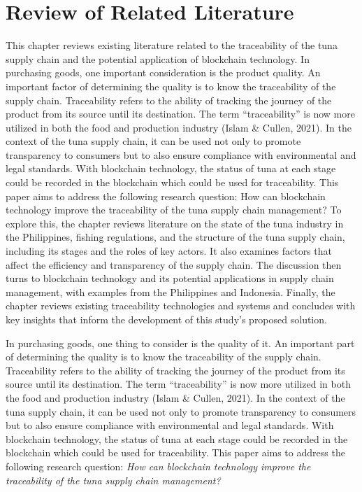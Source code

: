 \chapter{Review of Related Literature}
\label{sec:relatedlit}

This chapter reviews existing literature related to the traceability of the tuna supply chain and the potential application of blockchain technology. In purchasing goods, one important consideration is the product quality. An important factor of determining the quality is to know the traceability of the supply chain. Traceability refers to the ability of tracking the journey of the product from its source until its destination. The term “traceability” is now more utilized in both the food and production industry (Islam \& Cullen, 2021). In the context of the tuna supply chain, it can be used not only to promote transparency to consumers but to also ensure compliance with environmental and legal standards. With blockchain
technology, the status of tuna at each stage could be recorded in the blockchain which could be used for traceability. This paper aims to address the following research question: How can blockchain technology improve the traceability of the tuna supply chain management? To explore this, the chapter reviews literature on the state of the tuna industry in the Philippines, fishing regulations, and the structure of the tuna supply chain, including its stages and the roles of key actors. It also examines factors that affect the efficiency and transparency of the supply chain. The discussion then turns to blockchain technology and its potential applications in supply chain management, with examples from the Philippines and Indonesia. Finally, the chapter reviews existing traceability technologies and systems and concludes with key insights that inform the development of this study’s proposed solution. 

In purchasing goods, one thing to consider is the quality of it. An important part of determining the quality is to know the traceability of the supply chain. Traceability refers to the ability of tracking the journey of the product from its source until its destination. The term “traceability” is now more utilized in both the food and production industry (Islam \& Cullen, 2021).  In the context of the tuna supply chain, it can be used not only to promote transparency to consumers but to also ensure compliance with environmental and legal standards. With blockchain technology, the status of tuna at each stage could be recorded in the blockchain which could be used for traceability. This paper aims to address the following research question: \textit{How can blockchain technology improve the traceability of the tuna supply chain management?}

